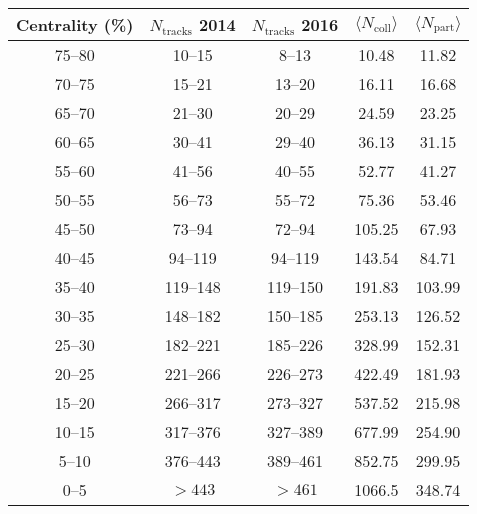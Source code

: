 \begin{tabular}{ccccc}
\toprule
  Centrality (\%) & $N_\mathrm{tracks}$ 2014 & $N_\mathrm{tracks}$ 2016 & $\langle N_\mathrm{coll} \rangle$ & $\langle N_\mathrm{part} \rangle$ \\
\midrule
75--80    &      10--15     &      8--13      &    10.48    &      11.82   \\   
70--75    &      15--21     &     13--20      &    16.11    &      16.68   \\   
65--70    &      21--30     &     20--29      &    24.59    &      23.25   \\   
60--65    &      30--41     &     29--40      &    36.13    &      31.15   \\   
55--60    &      41--56     &     40--55      &    52.77    &      41.27   \\   
50--55    &      56--73     &     55--72      &    75.36    &      53.46   \\   
45--50    &      73--94     &     72--94      &   105.25    &      67.93   \\   
40--45    &      94--119    &     94--119     &   143.54    &      84.71   \\   
35--40    &     119--148    &    119--150     &   191.83    &     103.99   \\   
30--35    &     148--182    &    150--185     &   253.13    &     126.52   \\   
25--30    &     182--221    &    185--226     &   328.99    &     152.31   \\   
20--25    &     221--266    &    226--273     &   422.49    &     181.93   \\   
15--20    &     266--317    &    273--327     &   537.52    &     215.98   \\   
10--15    &     317--376    &    327--389     &   677.99    &     254.90   \\   
 5--10    &     376--443    &    389--461     &   852.75    &     299.95   \\   
  0--5    &      $>443$     &     $> 461$     &   1066.5    &     348.74   \\   
\bottomrule
\end{tabular}
